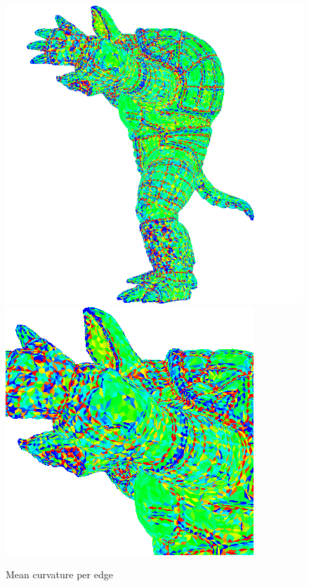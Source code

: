 \begin{figure}[!h]
    \centering
    \centering
    \includegraphics[scale=0.5]{images/mean-curvature-edge.png}
    \endminipage\hfill
    \centering
    \includegraphics[scale=1.0]{images/mean-curvature-edge-detail.png}
    \endminipage
    \caption{Mean curvature per edge} \label{fig:armadillo-mean-edge}
\end{figure}

